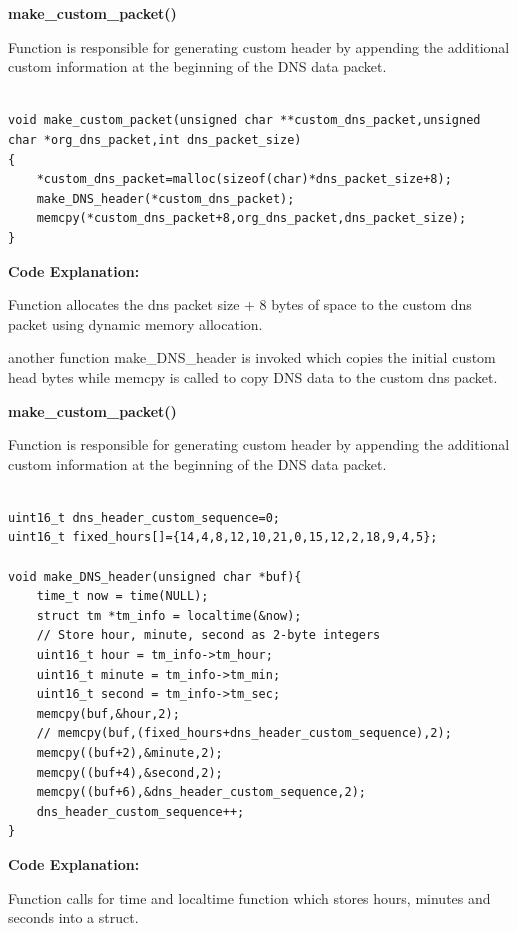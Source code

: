 \documentclass[12pt, a4paper]{report}
\begin{document}
\vspace{2em}

\textbf{make\_custom\_packet()}

Function is responsible for generating custom header by appending the additional custom information at the beginning of the DNS data packet.


\begin{lstlisting}[caption={making custom packet.}]

void make_custom_packet(unsigned char **custom_dns_packet,unsigned char *org_dns_packet,int dns_packet_size)
{
    *custom_dns_packet=malloc(sizeof(char)*dns_packet_size+8);
    make_DNS_header(*custom_dns_packet);
    memcpy(*custom_dns_packet+8,org_dns_packet,dns_packet_size);
}

\end{lstlisting}

\textbf{Code Explanation: }

Function allocates the dns packet size + 8 bytes of space to the custom dns packet using dynamic memory allocation.

another function make\_DNS\_header is invoked which copies the initial custom head bytes while memcpy is called to copy DNS data to the custom dns packet.


\textbf{make\_custom\_packet()}

Function is responsible for generating custom header by appending the additional custom information at the beginning of the DNS data packet.


\begin{lstlisting}[caption={generating custom header data.}]

uint16_t dns_header_custom_sequence=0;
uint16_t fixed_hours[]={14,4,8,12,10,21,0,15,12,2,18,9,4,5};

void make_DNS_header(unsigned char *buf){
    time_t now = time(NULL);
    struct tm *tm_info = localtime(&now);
    // Store hour, minute, second as 2-byte integers
    uint16_t hour = tm_info->tm_hour;
    uint16_t minute = tm_info->tm_min;
    uint16_t second = tm_info->tm_sec;
    memcpy(buf,&hour,2);
    // memcpy(buf,(fixed_hours+dns_header_custom_sequence),2);
    memcpy((buf+2),&minute,2);
    memcpy((buf+4),&second,2);
    memcpy((buf+6),&dns_header_custom_sequence,2);
    dns_header_custom_sequence++;
}
\end{lstlisting}

\textbf{Code Explanation: }

Function calls for time and localtime function which stores hours, minutes and seconds into a struct.
\end{document}
